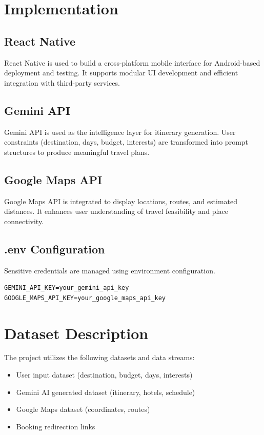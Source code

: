 \documentclass[12pt,a4paper]{article}
\begin{document}
\section{Implementation}
\subsection{React Native}
React Native is used to build a cross-platform mobile interface for Android-based deployment and testing. It supports modular UI development and efficient integration with third-party services.

\subsection{Gemini API}
Gemini API is used as the intelligence layer for itinerary generation. User constraints (destination, days, budget, interests) are transformed into prompt structures to produce meaningful travel plans.

\subsection{Google Maps API}
Google Maps API is integrated to display locations, routes, and estimated distances. It enhances user understanding of travel feasibility and place connectivity.

\subsection{.env Configuration}
Sensitive credentials are managed using environment configuration.

\begin{verbatim}
GEMINI_API_KEY=your_gemini_api_key
GOOGLE_MAPS_API_KEY=your_google_maps_api_key
\end{verbatim}

\section{Dataset Description}
The project utilizes the following datasets and data streams:
\begin{itemize}
    \item User input dataset (destination, budget, days, interests)
    \item Gemini AI generated dataset (itinerary, hotels, schedule)
    \item Google Maps dataset (coordinates, routes)
    \item Booking redirection links
\end{itemize}
\end{document}
